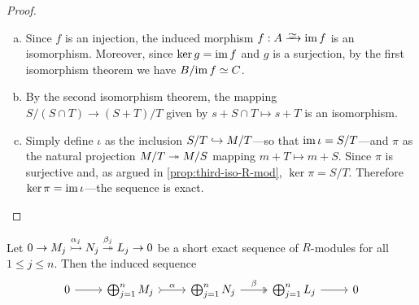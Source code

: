 \begin{proof}
    \begin{enumerate}[(a)]\setlength\itemsep{0em}
        \item Since \(f\) is an injection, the induced morphism \(f: A \isoto \im f\) is
              an isomorphism. Moreover, since \(\ker g = \operatorname{im} f\) and \(g\) is a surjection,
              by the first isomorphism theorem we have \(B/{\operatorname{im} f} \simeq C\).
        \item By the second isomorphism theorem, the mapping
              \(S/(S \cap T) \to (S + T)/T\) given by \(s + S \cap T \mapsto s + T\) is an
              isomorphism.
        \item Simply define \(\iota\) as the inclusion \(S/T \hookrightarrow M/T\)---so that
              \(\operatorname{im} \iota = S/T\)---and \(\pi\) as the natural projection \(M/T \twoheadrightarrow M/S\)
              mapping \(m + T \mapsto m + S\). Since \(\pi\) is surjective and, as argued in
              \cref{prop:third-iso-R-mod}, \(\ker \pi = S/T\). Therefore
              \(\ker \pi = \operatorname{im} \iota\)---the sequence is exact.
    \end{enumerate}
\end{proof}

\begin{proposition}
    \label{prop:induced-short-exact-sequence-direct-sum}
    Let \(0 \to M_j \overset{\alpha_j}{\rightarrowtail} N_j \overset{\beta_j}{\twoheadrightarrow} L_j \to 0\) be
    a short exact sequence of \(R\)-modules for all \(1 \leq j \leq n\). Then the
    induced sequence
    \[
        \begin{tikzcd}
            0 \ar[r] &\bigoplus_{j=1}^n M_j
            \ar[r, tail, "\alpha"]
            &\bigoplus_{j=1}^n N_j
            \ar[r, two heads, "\beta"]
            &\bigoplus_{j=1}^n L_j
            \ar[r]
            &0
        \end{tikzcd}
    \]
\end{proposition}

